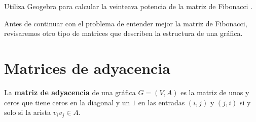 \begin{ejercicio}
Utiliza Geogebra para calcular la veinteava potencia de la matriz de Fibonacci .
\end{ejercicio}
Antes de continuar con el problema de entender mejor la matriz de Fibonacci, revisaremos otro tipo de matrices que describen la estructura de una gráfica.
\newpage

\section{Matrices de adyacencia}


\begin{definicion}
La {\bf matriz de adyacencia} de una gráfica $G=(V,A)$ es la matriz de unos y ceros que tiene ceros en la diagonal y un $1$ en las entradas $(i,j)$ y $(j,i)$ si y solo si la arista $v_iv_j\in A$. 
\end{definicion}


